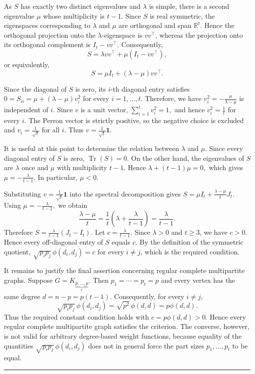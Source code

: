 \documentclass[12pt,twoside]{article}
\renewenvironment{proof}{{\noindent\bfseries Proof.}}{\qed}
\newcommand{\Tr}{\operatorname{Tr}}
\def\qed{\nolinebreak\hfill\rule{.2cm}{.2cm}\par\addvspace{.5cm}}
\begin{document}
\begin{proof}
	As $S$ has exactly two distinct eigenvalues and $\lambda$ is simple, there is a second eigenvalue $\mu$ whose multiplicity is $t-1$. Since $S$ is real symmetric, the eigenspaces corresponding to $\lambda$ and $\mu$ are orthogonal and span $\mathbb R^t$. Hence the orthogonal projection onto the $\lambda$-eigenspace is $vv^{\top}$, whereas the projection onto its orthogonal complement is $I_t-vv^{\top}$. Consequently,
	$$
	S
	=
	\lambda vv^{\top}
	+
	\mu(I_t-vv^{\top}),
	$$
	or equivalently,
	$$
	S
	=
	\mu I_t+(\lambda-\mu)vv^{\top}.
	$$
	
	Since the diagonal of $S$ is zero, its $i$-th diagonal entry satisfies
	$
	0
	=
	S_{ii}
	=
	\mu+(\lambda-\mu)v_i^2
	$
	for every $i=1,\ldots,t$. Therefore, we have
	$
	v_i^2
	=
	-\tfrac{\mu}{\lambda-\mu}
	$
	is independent of $i$. Since $v$ is a unit vector,
	$
	\sum_{i=1}^{t}v_i^2=1,
	$
	and hence
	$
	v_i^2=\tfrac1t
	$
	for every $i$. The Perron vector is strictly positive, so the negative choice is excluded and
	$
	v_i=\tfrac1{\sqrt t}
	$
	for all $i$. Thus
	$
	v=\tfrac1{\sqrt t}\mathbf 1.
	$
	
	It is useful at this point to determine the relation between $\lambda$ and $\mu$. Since every diagonal entry of $S$ is zero,
	$
	\Tr(S)=0.
	$
	On the other hand, the eigenvalues of $S$ are $\lambda$ once and $\mu$ with multiplicity $t-1$. Hence
	$
	\lambda+(t-1)\mu=0,
	$
	which gives
	$
	\mu=-\tfrac{\lambda}{t-1}.
	$
	In particular, $\mu<0$.
	
	Substituting $v=\tfrac1{\sqrt t}\mathbf 1$ into the spectral decomposition gives
	$
	S	=	\mu I_t	+	\tfrac{\lambda-\mu}{t}J_t.
	$
	Using
	$
	\mu=-\tfrac{\lambda}{t-1},
	$
	we obtain
	$$
	\frac{\lambda-\mu}{t}
	=
	\frac1t
	\left(
	\lambda+\frac{\lambda}{t-1}
	\right)
	=
	\frac{\lambda}{t-1}.
	$$
	Therefore
	$
	S
	=
	\tfrac{\lambda}{t-1}(J_t-I_t).
	$
	Let
	$
	c=\tfrac{\lambda}{t-1}.
	$
	Since $\lambda>0$ and $t\geq3$, we have $c>0$. Hence every off-diagonal entry of $S$ equals $c$. By the definition of the symmetric quotient,
	$
	\sqrt{p_ip_j}\,\phi(d_i,d_j)=c
	$
	for every $i\neq j$, which is the required condition.
	
	It remains to justify the final assertion concerning regular complete multipartite graphs. Suppose
	$
	G=K_{\underbrace{p,\ldots,p}_{t}}.
	$
	Then
	$
	p_1=\cdots=p_t=p
	$
	and every vertex has the same degree
	$
	d=n-p=p(t-1).
	$
	Consequently, for every $i\neq j$,
	$$
	\sqrt{p_ip_j}\,\phi(d_i,d_j)
	=
	\sqrt{p^2}\,\phi(d,d)
	=
	p\phi(d,d).
	$$
	Thus the required constant condition holds with
	$
	c=p\phi(d,d)>0.
	$
	Hence every regular complete multipartite graph satisfies the criterion. The converse, however, is not valid for arbitrary degree-based weight functions, because equality of the quantities
	$
	\sqrt{p_ip_j}\,\phi(d_i,d_j)
	$
	does not in general force the part sizes $p_1,\ldots,p_t$ to be equal. 
\end{proof}
\end{document}
